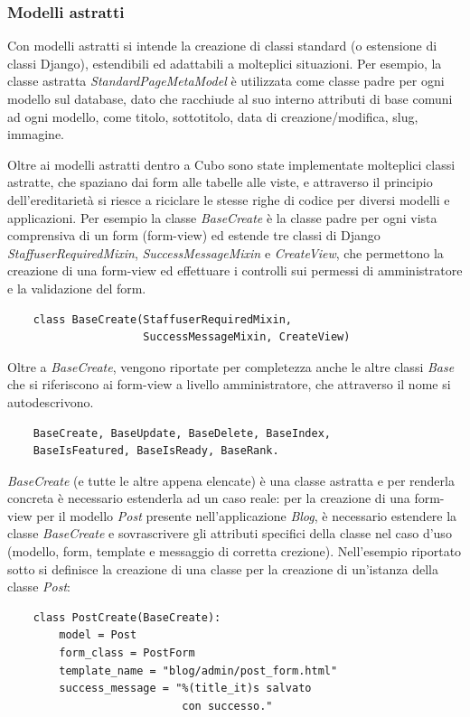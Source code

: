 \documentclass[12pt,a4paper]{article}
\begin{document}
\subsubsection{Modelli astratti}
Con modelli astratti si intende la creazione di classi standard (o estensione di classi Django), estendibili ed adattabili a molteplici situazioni. Per esempio, la classe astratta \textit{StandardPageMetaModel} è utilizzata come classe padre per ogni modello sul database, dato che racchiude al suo interno attributi di base comuni ad ogni modello, come titolo, sottotitolo, data di creazione/modifica, slug, immagine.

Oltre ai modelli astratti dentro a Cubo sono state implementate molteplici classi astratte, che spaziano dai form alle tabelle alle viste, e attraverso il principio dell'ereditarietà si riesce a riciclare le stesse righe di codice per diversi modelli e applicazioni. Per esempio la classe \textit{BaseCreate} è la classe padre per ogni vista comprensiva di un form (form-view) ed estende tre classi di Django \textit{StaffuserRequiredMixin}, \textit{SuccessMessageMixin} e \textit{CreateView}, che permettono la creazione di una form-view ed effettuare i controlli sui permessi di amministratore e la validazione del form.
\begin{verbatim}
    class BaseCreate(StaffuserRequiredMixin,
                     SuccessMessageMixin, CreateView)
\end{verbatim}

Oltre a \textit{BaseCreate}, vengono riportate per completezza anche le altre classi \textit{Base} che si riferiscono ai form-view a livello amministratore, che attraverso il nome si autodescrivono.

\begin{verbatim}
    BaseCreate, BaseUpdate, BaseDelete, BaseIndex,
    BaseIsFeatured, BaseIsReady, BaseRank.
\end{verbatim}

\textit{BaseCreate} (e tutte le altre appena elencate) è una classe astratta e per renderla concreta è necessario estenderla ad un caso reale: per la creazione di una form-view per il modello \textit{Post} presente nell'applicazione \textit{Blog}, è necessario estendere la classe \textit{BaseCreate} e sovrascrivere gli attributi specifici della classe nel caso d'uso (modello, form, template e messaggio di corretta crezione). Nell'esempio riportato sotto si definisce la creazione di una classe per la creazione di un'istanza della classe \textit{Post}:
\begin{verbatim}
    class PostCreate(BaseCreate):
        model = Post
        form_class = PostForm
        template_name = "blog/admin/post_form.html"
        success_message = "%(title_it)s salvato
                           con successo."
\end{verbatim}
\end{document}
